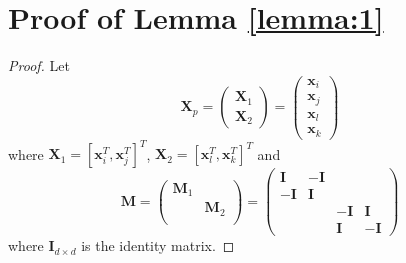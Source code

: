 \documentclass[./sbb_ordinal_embedding_aaai18.tex]{subfiles}%
\begin{document}
%


\section{Proof of Lemma \ref{lemma:1}}
	\label{proof:lemma1}
	\begin{proof}
		Let
		\begin{equation}
		\mathbf{X}_p =
		\begin{pmatrix}
		\mathbf{X}_1 \\
		\mathbf{X}_2
		\end{pmatrix} =
		\begin{pmatrix}
		\mathbf{x}_i \\
		\mathbf{x}_j \\
		\mathbf{x}_l \\
		\mathbf{x}_k
		\end{pmatrix}
		\end{equation}
		where $\mathbf{X}_1=[\mathbf{x}_i^T,\mathbf{x}_j^T]^T$, $\mathbf{X}_2=[\mathbf{x}_l^T,\mathbf{x}_k^T]^T$ and
		\begin{equation}
		\mathbf{M} =
		\left(\begin{array}{cc}
		\mathbf{M}_1 & \\
		& \mathbf{M}_2 \\
		\end{array}\right) =
		\left(\begin{array}{rrrr}
		\mathbf{I}& -\mathbf{I}&  &   \\
		-\mathbf{I}& \mathbf{I}&  &   \\
		&  & -\mathbf{I}& \mathbf{I} \\
		&  &  \mathbf{I}& -\mathbf{I}
		\end{array}\right)
		\end{equation}
		where $\mathbf{I}_{d\times d}$ is the identity matrix.
		

\end{proof}
\end{document}
